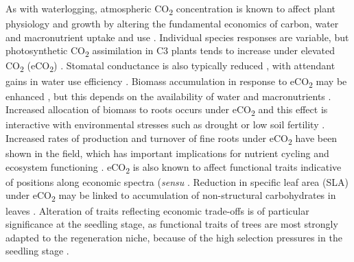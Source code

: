 \documentclass[12pt,a4paper]{memoir}
\begin{document}
As with waterlogging, atmospheric CO\textsubscript{2} concentration is known to affect plant physiology and growth by altering the fundamental economics of carbon, water and macronutrient uptake and use \citep{Poorter2003a, Wang2012, Reich2014}.  Individual species responses are variable, but photosynthetic CO\textsubscript{2} assimilation in C3 plants tends to increase under elevated CO\textsubscript{2} (eCO\textsubscript{2}) \citep{Curtis1996}. Stomatal conductance is also typically reduced \citep{Ainsworth2007}, with attendant gains in water use efficiency \citep{Holtum2010, Keenan2013, VanderSleen2014}. Biomass accumulation in response to eCO\textsubscript{2} may be enhanced \citep{Wang2012}, but this depends on the availability of water and macronutrients \citep{Korner2006, Manea2014, Reich2014}. Increased allocation of biomass to roots occurs under eCO\textsubscript{2} \citep{Nie2013} and this effect is interactive with environmental stresses such as drought or low soil fertility \citep{Wang2010}. Increased rates of production and turnover of fine roots under eCO\textsubscript{2} have been shown in the field, which has important implications for nutrient cycling and ecosystem functioning \citep{Pregitzer1995, Pregitzer2000, Matamala2000, Lipson2014}. eCO\textsubscript{2} is also known to affect functional traits indicative of positions along economic spectra (\textit{sensu} \citet{Reich2014a}. Reduction in specific leaf area (SLA) under eCO\textsubscript{2} may be linked to accumulation of non-structural carbohydrates in leaves \citep{Poorter2003a, Bader2010}. Alteration of traits reflecting economic trade-offs is of particular significance at the seedling stage, as functional traits of trees are most strongly adapted to the regeneration niche, because of the high selection pressures in the seedling stage \citep{Poorter2007}.
\end{document}
